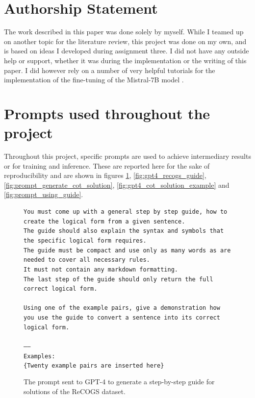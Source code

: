 \documentclass[11pt]{article}
\begin{document}
    \section*{Authorship Statement}
    The work described in this paper was done solely by myself.
    While I teamed up on another topic for the literature review, this project was done on my own, and is based on ideas
    I developed during assignment three.
    I did not have any outside help or support, whether it was during the implementation or the writing of this paper.
    I did however rely on a number of very helpful tutorials for the implementation of the fine-tuning of the Mistral-7B
    model \cite{unsloth_unslothmistral-7b-instruct-v02-bnb-4bit_2024, labonne_fine-tune_2024}.

    

    \appendix


    \section{Prompts used throughout the project}\label{sec:appendix}
    Throughout this project, specific prompts are used to achieve intermediary results or for training and inference.
    These are reported here for the sake of reproducibility and are shown in figures \ref{fig:guide_prompt},
    \ref{fig:gpt4_recogs_guide}, \ref{fig:prompt_generate_cot_solution}, \ref{fig:gpt4_cot_solution_example} and \ref{fig:prompt_using_guide}.

    \begin{figure}
        \small
        \texttt{You must come up with a general step by step guide, how to create the logical form from a given sentence.\\
        The guide should also explain the syntax and symbols that the specific logical form requires.\\
        The guide must be compact and use only as many words as are needed to cover all necessary rules.\\
        It must not contain any markdown formatting.\\
        The last step of the guide should only return the full correct logical form.\\
        \\
        Using one of the example pairs, give a demonstration how you use the guide to convert a sentence into its correct logical form.\\
        \\
        -----\\
        Examples:\\
        {\color{red}\{Twenty example pairs are inserted here\}}
        }
        \caption{The prompt sent to GPT-4 to generate a step-by-step guide for solutions of the ReCOGS dataset.}
        \label{fig:guide_prompt}
    \end{figure}
\end{document}
